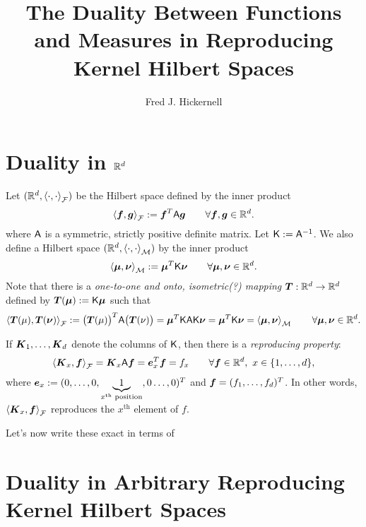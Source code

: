 \documentclass{amsart}
\begin{document}
\title{The Duality Between Functions and Measures in Reproducing Kernel Hilbert Spaces}
\author{Fred J. Hickernell}


\maketitle

\section{Duality in $\reals^d$}

Let $(\reals^d,\ip[\cf]{\cdot}{\cdot})$ be the Hilbert space defined by the inner product 
\begin{equation*}
    \ip[\cf]{\vf}{\vg} := \vf^T \mA \vg \qquad \forall \vf, \vg \in \reals^d.
\end{equation*}
where $\mA$ is a symmetric, strictly positive definite matrix.  Let $\mK :=  \mA^{-1}$.  We also define a Hilbert space $(\reals^d,\ip[\cm]{\cdot}{\cdot})$ by the inner product
\begin{equation*}
    \ip[\cm]{\vmu}{\vnu} := \vmu^T \mK \vnu \qquad \forall \vmu, \vnu \in \reals^d.
\end{equation*}
Note that there is a \emph{one-to-one and onto, isometric(?) mapping} $\vT: \reals^d \to \reals^d$ defined by $\vT(\vmu) := \mK \vmu$ such that 
\begin{equation*}
    \ip[\cf]{\vT(\mu)}{\vT(\vnu)} := \bigl(\vT(\mu)\bigr)^T \mA \bigl(\vT(\nu)\bigr) = \vmu^T \mK \mA \mK \vnu = \vmu^T \mK \vnu = \ip[\cm]{\vmu}{\vnu} \qquad \forall \vmu, \vnu \in \reals^d.
\end{equation*}

If $\vK_1, \ldots, \vK_d$ denote the columns of $\mK$, then there is a \emph{reproducing property}:
\begin{equation*}
    \ip[\cf]{\vK_x}{\vf} = \vK_x \mA \vf = \ve_x^T \vf = f_x \qquad \forall \vf \in \reals^d, \ x \in \{1, \ldots, d\},
\end{equation*}
where $\ve_x := (0, \ldots, 0,\underbrace{1}_{x^{\text{th}} \text{ position}}, 0 \ldots, 0)^T$ and $\vf = (f_1, \ldots, f_d)^T$.  In other words, $ \ip[\cf]{\vK_x}{\vf}$ reproduces the $x^{\text{th}}$ element of $f$.


Let's now write these exact  in terms of 



\section{Duality in Arbitrary Reproducing Kernel Hilbert Spaces}





\end{document}
